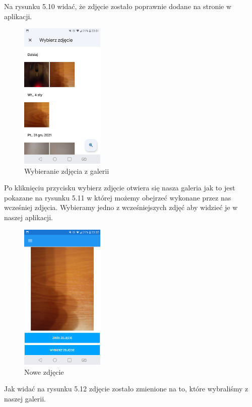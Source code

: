 Na rysunku 5.10 widać, że zdjęcie zostało poprawnie dodane na stronie w aplikacji.

\begin{figure}[!htb]
	\begin{center}
		\includegraphics[width=4cm]{rys/ZZfoto3.png}
		\caption{Wybieranie zdjęcia z galerii}
		\label{rys:rysunek039}
	\end{center}
\end{figure}

Po kliknięciu przycisku wybierz zdjęcie otwiera się nasza galeria jak to jest pokazane na rysunku 5.11 w której możemy obejrzeć wykonane przez nas wcześniej zdjęcia. Wybieramy jedno z wcześniejszych zdjęć aby widzieć je w naszej aplikacji.

\begin{figure}[!htb]
	\begin{center}
		\includegraphics[width=4cm]{rys/ZZfoto4.png}
		\caption{Nowe zdjęcie}
		\label{rys:rysunek0340}
	\end{center}
\end{figure}

Jak widać na rysunku 5.12 zdjęcie zostało zmienione na to, które wybraliśmy z naszej galerii.

